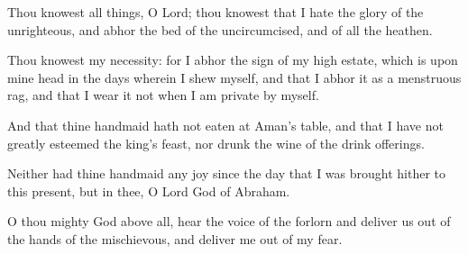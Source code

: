 {\par }{\PP {}Thou knowest all things, O Lord; thou knowest that I hate the glory of the unrighteous, and abhor the bed of the uncircumcised, and of all the heathen.
\par }{\PP {}Thou knowest my necessity: for I abhor the sign of my high estate, which is upon mine head in the days wherein I shew myself, and that I abhor it as a menstruous rag, and that I wear it not when I am private by myself.
\par }{\PP {}And that thine handmaid hath not eaten at Aman’s table, and that I have not greatly esteemed the king’s feast, nor drunk the wine of the drink offerings.
\par }{\PP {}Neither had thine handmaid any joy since the day that I was brought hither to this present, but in thee, O Lord God of Abraham.
\par }{\PP {}O thou mighty God above all, hear the voice of the forlorn and deliver us out of the hands of the mischievous, and deliver me out of my fear.

}
